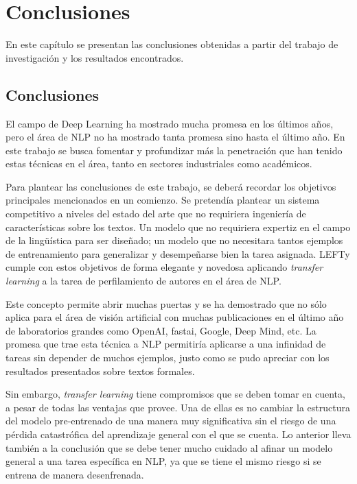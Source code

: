 
\chapter{Conclusiones}

\label{Chapter6} %

En este capítulo se presentan las conclusiones obtenidas a partir del trabajo de investigación y los resultados encontrados.

\section{Conclusiones}

El campo de Deep Learning ha mostrado mucha promesa en los últimos años, pero el área de NLP no ha mostrado tanta promesa sino hasta el último año. En este trabajo se busca fomentar y profundizar más la penetración que han tenido estas técnicas en el área, tanto en sectores industriales como académicos.

Para plantear las conclusiones de este trabajo, se deberá recordar los objetivos principales mencionados en un comienzo. Se pretendía plantear un sistema competitivo a niveles del estado del arte que no requiriera ingeniería de características sobre los textos. Un modelo que no requiriera expertiz en el campo de la lingüística para ser diseñado; un modelo que no necesitara tantos ejemplos de entrenamiento para generalizar y desempeñarse bien la tarea asignada. LEFTy cumple con estos objetivos de forma elegante y novedosa aplicando \textit{transfer learning} a la tarea de perfilamiento de autores en el área de NLP.

Este concepto permite abrir muchas puertas y se ha demostrado que no sólo aplica para el área de visión artificial con muchas publicaciones en el último año de laboratorios grandes como OpenAI, fastai, Google, Deep Mind, etc. La promesa que trae esta técnica a NLP permitiría aplicarse a una infinidad de tareas sin depender de muchos ejemplos, justo como se pudo apreciar con los resultados presentados sobre textos formales.

Sin embargo, \textit{transfer learning} tiene compromisos que se deben tomar en cuenta, a pesar de todas las ventajas que provee. Una de ellas es no cambiar la estructura del modelo pre-entrenado de una manera muy significativa sin el riesgo de una pérdida catastrófica del aprendizaje general con el que se cuenta. Lo anterior lleva también a la conclusión que se debe tener mucho cuidado al afinar un modelo general a una tarea específica en NLP, ya que se tiene el mismo riesgo si se entrena de manera desenfrenada.

